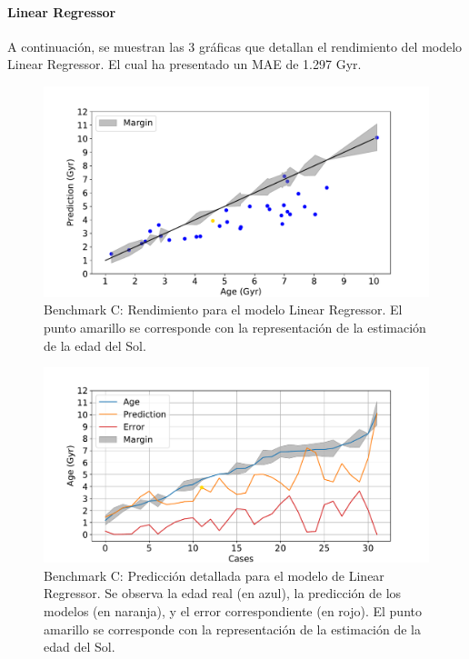\paragraph{Linear Regressor} 
A continuación, se muestran las 3 gráficas que detallan el rendimiento del modelo Linear Regressor. El cual ha presentado un MAE de 1.297 Gyr.

\begin{figure}[H]
\begin{center}
 \includegraphics[width=0.8\linewidth]{Figuras/Experimentos/B_C_lr_1.pdf}
\end{center}
\caption{Benchmark C: Rendimiento para el modelo Linear Regressor. El punto amarillo se corresponde con la representación de la estimación de la edad del Sol.}
 \label{fig:benchC_details_lr_1}
\end{figure}

\begin{figure}[H]
\begin{center}
 \includegraphics[width=0.8\linewidth]{Figuras/Experimentos/B_C_lr_2.pdf}
\end{center}
\caption{Benchmark C: Predicción detallada para el modelo de Linear Regressor. Se observa la edad real (en azul), la predicción de los modelos (en naranja), y el error correspondiente (en rojo). El punto amarillo se corresponde con la representación de la estimación de la edad del Sol.}
 \label{fig:benchC_details_lr_2}
\end{figure}

